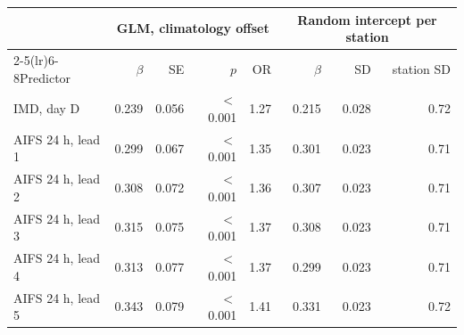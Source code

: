\begin{tabular}{lrrrrrrr}\toprule & \multicolumn{4}{c}{GLM, climatology offset} & \multicolumn{3}{c}{Random intercept per station} \\ \cmidrule(lr){2-5}\cmidrule(lr){6-8}Predictor & $\beta$ & SE & $p$ & OR & $\beta$ & SD & station SD \\ \midrule
IMD, day D & 0.239 & 0.056 & $<$0.001 & 1.27 & 0.215 & 0.028 & 0.72 \\
AIFS 24 h, lead 1 & 0.299 & 0.067 & $<$0.001 & 1.35 & 0.301 & 0.023 & 0.71 \\
AIFS 24 h, lead 2 & 0.308 & 0.072 & $<$0.001 & 1.36 & 0.307 & 0.023 & 0.71 \\
AIFS 24 h, lead 3 & 0.315 & 0.075 & $<$0.001 & 1.37 & 0.308 & 0.023 & 0.71 \\
AIFS 24 h, lead 4 & 0.313 & 0.077 & $<$0.001 & 1.37 & 0.299 & 0.023 & 0.71 \\
AIFS 24 h, lead 5 & 0.343 & 0.079 & $<$0.001 & 1.41 & 0.331 & 0.023 & 0.72 \\
\bottomrule\end{tabular}